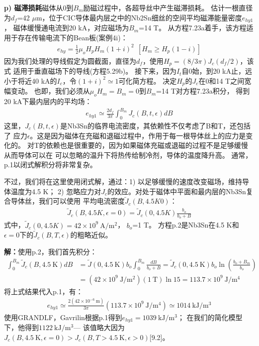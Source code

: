 \textbf{p) 磁滞损耗}\qquad 磁体从0到$B_m$励磁过程中，各超导丝中产生磁滞损耗。
估计一根直径为$d_f$=42 $\mu$m，位于CIC导体最内层之中的Nb2Sn细丝的空间平均磁滞能量密度$e_{hy1}$，
磁体缓慢通电流到20 kA，对应磁场为$B_m$=14 T。
从方程7.23a着手，该方程适用于存在传输电流下的Bean板(案例4i)：
\begin{align*}%
e_{hy}=\frac{1}{2}\mu_oH_pH_m(1+i)^2\     \ [H_m\geq H_p(1-i)] \tag{7.23a}
\end{align*}
因为我们处理的导线假定为圆截面，直径为$d_f$，使用$H_p=(8/3\pi)J_c(d_f/2)$，该式
适用于垂直磁场下的导线(方程5.29b)。
接下来，因为$I_t$自0始，到20 kA止，远小于将近40 kA的$I_c$，令$(1+i)^2\simeq 1$可化简方程。
决定$H_p$的$J_c$在0和14 T之间宽幅变动。
也即，我们必须从$\mu_o H_m=B_m=0$到$B_m$=14 T对方程7.23a积分，
得到20 kA下最内层内的平均场：
\begin{align*}%
e_{hy1}\simeq\frac{2d_f}{3\pi}\int_{0}^{B_m}J_c(B,t,\epsilon)dB \tag{p.1}
\end{align*}
这里，$J_c(B,t,\epsilon)$是Nb3Sn的临界电流密度，其依赖性不仅考虑了B和T，还包括了
应力$\epsilon$。这是因为磁体在充磁和退磁过程中，作用于每一根导体丝上的应力是变化的。
对T的依赖也是很重要的，因为如果磁体充磁或退磁的过程不是足够缓慢从而导体可以在
可以忽略的温升下将热传给制冷剂，导体的温度降升高。
通常，p.1以闭式解积分将非常复杂。

不过，我们将在这里使用闭式解，通过：1) 以足够缓慢的速度改变磁场，维持导体温度为4.5 K；
2) 忽略应力对$J_c$的效应。对处于磁体中平面和最内层的Nb3Sn复合导体丝，我们可以使用
平均电流密度$\tilde{J}_c(B,4.5K0)$：
\begin{align*}%
\tilde{J}_c(B,4.5K,\epsilon=0)=\tilde{J}_c(0,4.5K)\frac{b_o}{b_o+B} \tag{p.2}
\end{align*}
式中，$\tilde{J}_c(0,4.5K)=42\times 10^9\ \mathrm{ A/m^2}$，
$b_o$=1 T。
方程p.2是Nb3Sn在4.5 K和$\epsilon=0$下的$\tilde{J}_c(B,T,\epsilon)$的粗略近似。

\textbf{解：}使用p.2，我们首先积分：
\begin{align*}%
\int_{0}^{B_m}\tilde{J}_c(B,4.5\ \mathrm{K})dB&=\tilde{J}(0,4.5\ \mathrm{K})b_o\int_{0}^{B_m}\frac{dB}{b_o+B}=\tilde{J}_c(0,4.5\ \mathrm{K})b_o\ln(\frac{b_o+B_m}{b_o})\\
&=(42\times10^9\ \mathrm{J/m^2})(1\ \mathrm{T})\ln15=113.7\times10^9\ \mathrm{J/m^4}
\end{align*}
将上式结果代入p.1，有：
\begin{align*}%
e_{hy1}\simeq\frac{2(42\times10^{-6}\ \mathrm{m})}{3\pi}(113.7\times10^9\ \mathrm{J/m^4})\simeq1014\ \mathrm{kJ/m^3}
\end{align*}
使用GRANDLF，Gavrilin根据p.1得到$e_{hy1}=1039\ \mathrm{kJ/m^3}$；
在我们的简化模型下，他得到$1122\ \mathrm{kJ/m^3}$---
该值略大因为$J_c(B,4.5\ \mathrm{K},\epsilon=0)>J_c(B,T>4.5\ \mathrm{K},\epsilon>0)$[9.2]。

